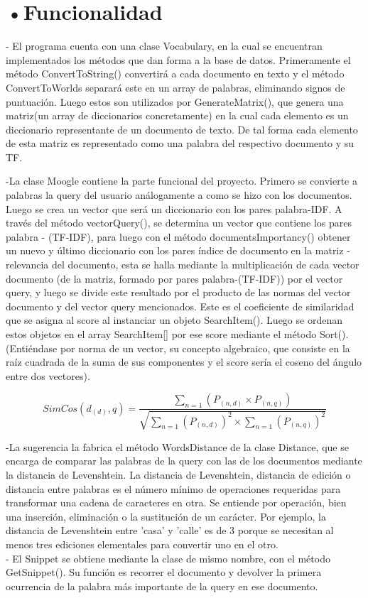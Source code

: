 \documentclass[aspectratio = 169, 14pt]{article}
\begin{document}
\section{•Funcionalidad}
\begin{Large}

- El programa cuenta con una clase
Vocabulary, en la cual se encuentran
implementados los métodos que dan forma a
la base de datos. Primeramente el método
ConvertToString() convertirá a cada
documento en texto y el método
ConvertToWorlds separará este en un array de
palabras, eliminando signos de puntuación.
Luego estos son utilizados por
GenerateMatrix(), que genera una matriz(un
array de diccionarios concretamente) en la
cual cada elemento es un diccionario
representante de un documento de texto. De
tal forma cada elemento de esta matriz es
representado como una palabra del respectivo
documento y su TF.

-La clase Moogle contiene la parte funcional
del proyecto. Primero se convierte a palabras
la query del usuario análogamente a como se
hizo con los documentos. Luego se crea un
vector que será un diccionario con los pares
palabra-IDF. A través del método vectorQuery(),
se determina un vector que contiene los pares
palabra - (TF-IDF), para luego con el método
documentsImportancy() obtener un nuevo y
último diccionario con los pares índice de
documento en la matriz - relevancia del
documento, esta se halla mediante la
multiplicación de cada vector
documento (de la matriz, formado por pares
palabra-(TF-IDF)) por el vector query, y luego
se divide este resultado por el producto de las
normas del vector documento y del vector
query mencionados. Este es el coeficiente de
similaridad que se asigna al score al
instanciar un objeto SearchItem(). Luego se
ordenan estos objetos en el array SearchItem[]
por ese score mediante el método Sort().
(Entiéndase por norma de un vector, su
concepto algebraico, que consiste en la raíz
cuadrada de la suma de sus componentes y el
score sería el coseno del ángulo entre dos
vectores).

\begin{displaymath}
SimCos(d_{(d)},q)=\frac{\displaystyle\sum_{n=1}(P_{(n,d)}\times P_{(n,q)})}{\sqrt{\displaystyle\sum_{n=1}(P_{(n,d)})^2 \times \displaystyle\sum_{n=1}(P_{(n,q)})^2}}
\end{displaymath}

-La sugerencia la fabrica el método
WordsDistance de la clase Distance, que se
encarga de comparar las palabras de la query
con las de los documentos mediante la
distancia de Levenshtein.
La distancia de Levenshtein, distancia de
edición o distancia entre palabras es el
número mínimo de operaciones requeridas
para transformar una cadena de caracteres en
otra. Se entiende por operación, bien una
inserción, eliminación o la sustitución de un
carácter. Por ejemplo, la distancia de
Levenshtein entre 'casa' y 'calle' es de 3
porque se necesitan al menos tres ediciones
elementales para convertir uno en el otro.\\
- El Snippet se obtiene mediante la clase de
mismo nombre, con el método GetSnippet().
Su función es recorrer el documento y devolver
la primera ocurrencia de la palabra más
importante de la query en ese documento.


\end{Large}
\end{document}
